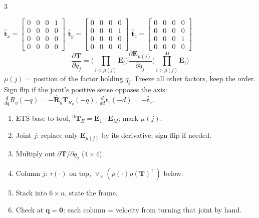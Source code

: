 \begin{multicols}{3}
\begin{fbx}
{$\hat{\mathbf t}_x=\begin{bmatrix}0&0&0&1\\0&0&0&0\\0&0&0&0\\0&0&0&0\end{bmatrix}$ $\hat{\mathbf t}_y=\begin{bmatrix}0&0&0&0\\0&0&0&1\\0&0&0&0\\0&0&0&0\end{bmatrix}$ $\hat{\mathbf t}_z=\begin{bmatrix}0&0&0&0\\0&0&0&0\\0&0&0&1\\0&0&0&0\end{bmatrix}$}
\[\frac{\partial\mathbf T}{\partial q_j}=\Big(\prod_{i<\mu(j)}\mathbf E_i\Big)\frac{\partial\mathbf E_{\mu(j)}}{\partial q_j}\Big(\prod_{i>\mu(j)}^{M}\mathbf E_i\Big)\]
$\mu(j)$ = position of the factor holding $q_j$. Freeze all other factors, keep the order. Sign flip if the joint's positive sense opposes the axis: $\frac{d}{dq}R_y(-q)=-\hat{\mathbf R}_y\mathbf T_{R_y}(-q)$, $\frac{d}{dd}t_z(-d)=-\hat{\mathbf t}_z$.
\end{fbx}
\begin{recipe}
\begin{enumerate}
\item ETS base to tool, ${}^0\mathbf T_E=\mathbf E_1\cdots\mathbf E_M$; mark $\mu(j)$.
\item Joint $j$: replace only $\mathbf E_{\mu(j)}$ by its derivative; sign flip if needed.
\item Multiply out $\partial\mathbf T/\partial q_j$ ($4\times4$).
\item Column $j$: $\tau(\cdot)$ on top, $\vee_\times(\rho(\cdot)\rho(\mathbf T)^\top)$ below.
\item Stack into $6\times n$, state the frame.
\item Check at $\mathbf q=\mathbf 0$: each column = velocity from turning that joint by hand.
\end{enumerate}
\end{recipe}


\end{multicols}
